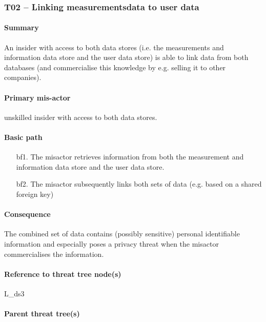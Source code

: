 \subsubsection{T02 -- Linking measurementsdata to user data}
\label{threats:t02}
\paragraph{Summary}

\npar An insider with access to both data stores (i.e. the measurements and
information data store and the user data store) is able to link data from both
databases (and commercialise this knowledge by e.g. selling it to other
companies).

\paragraph{Primary mis-actor}

\npar unskilled insider with access to both data stores.

\paragraph{Basic path}

\begin{enumerate}
	\item[bf1.] The misactor retrieves information from both the measurement and
	information data store and the user data store.
    \item[bf2.] The misactor subsequently links both sets of data (e.g. based
    on a shared foreign key)
\end{enumerate}

\paragraph{Consequence}

\npar The combined set of data contains (possibly sensitive) personal
identifiable information and especially poses a privacy threat when the misactor
commercialises the information.

\paragraph{Reference to threat tree node(s)}

L\_ds3

\paragraph{Parent threat tree(s)}

